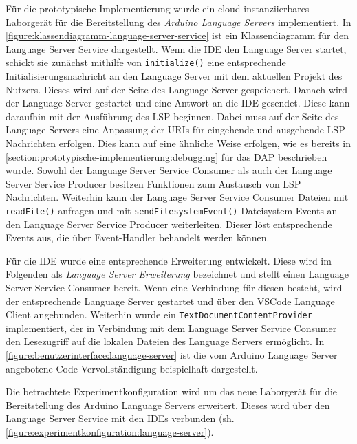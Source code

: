 Für die prototypische Implementierung wurde ein cloud-instanziierbares Laborgerät für die Bereitstellung des \textit{Arduino Language Servers} \cite{noauthor_arduino-language-server_2025} implementiert. In \autoref{figure:klassendiagramm-language-server-service} ist ein Klassendiagramm für den Language Server Service dargestellt. Wenn die IDE den Language Server startet, schickt sie zunächst mithilfe von \texttt{initialize()} eine entsprechende Initialisierungsnachricht an den Language Server mit dem aktuellen Projekt des Nutzers. Dieses wird auf der Seite des Language Server gespeichert. Danach wird der Language Server gestartet und eine Antwort an die IDE gesendet. Diese kann daraufhin mit der Ausführung des \ac{LSP} beginnen. Dabei muss auf der Seite des Language Servers eine Anpassung der URIs für eingehende und ausgehende \ac{LSP} Nachrichten erfolgen. Dies kann auf eine ähnliche Weise erfolgen, wie es bereits in \autoref{section:prototypische-implementierung:debugging} für das \ac{DAP} beschrieben wurde. Sowohl der Language Server Service Consumer als auch der Language Server Service Producer besitzen Funktionen zum Austausch von LSP Nachrichten. Weiterhin kann der Language Server Service Consumer Dateien mit \texttt{readFile()} anfragen und mit \texttt{sendFilesystemEvent()} Dateisystem-Events an den Language Server Service Producer weiterleiten. Dieser löst entsprechende Events aus, die über Event-Handler behandelt werden können.

Für die IDE wurde eine entsprechende Erweiterung entwickelt. Diese wird im Folgenden als \textit{Language Server Erweiterung} bezeichnet und stellt einen Language Server Service Consumer bereit. Wenn eine Verbindung für diesen besteht, wird der entsprechende Language Server gestartet und über den VSCode Language Client angebunden. Weiterhin wurde ein \texttt{TextDocumentContentProvider} implementiert, der in Verbindung mit dem Language Server Service Consumer den Lesezugriff auf die lokalen Dateien des Language Servers ermöglicht. In \autoref{figure:benutzerinterface:language-server} ist die vom Arduino Language Server angebotene Code-Vervollständigung beispielhaft dargestellt.

Die betrachtete Experimentkonfiguration wird um das neue Laborgerät für die Bereitstellung des Arduino Language Servers erweitert. Dieses wird über den Language Server Service mit den IDEs verbunden (sh. \autoref{figure:experimentkonfiguration:language-server}).